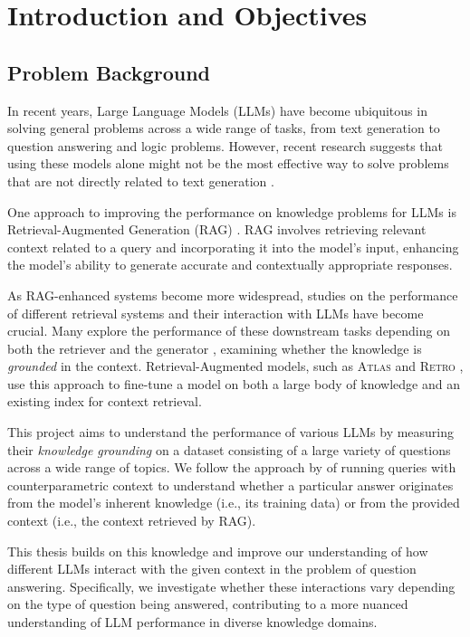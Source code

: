 \section{Introduction and Objectives}

\subsection{Problem Background}

In recent years, Large Language Models (LLMs) have become ubiquitous in solving general problems across a wide range of tasks, from text generation to question answering and logic problems.
However, recent research suggests that using these models alone might not be the most effective way to solve problems that are not directly related to text generation \citep{treeofthoughts}.

One approach to improving the performance on knowledge problems for LLMs is Retrieval-Augmented Generation (RAG) \citep{rag}. RAG involves retrieving relevant context related to a query and incorporating it into the model's input, enhancing the model's ability to generate accurate and contextually appropriate responses.

As RAG-enhanced systems become more widespread, studies on the performance of different retrieval systems and their interaction with LLMs have become crucial.
Many explore the performance of these downstream tasks depending on both the retriever and the generator \citep{can_rag_models_reason,fewshotlearners}, examining whether the knowledge is \textit{grounded} in the context.
Retrieval-Augmented models, such as \textsc{Atlas} \citep{atlas_foundational} and \textsc{Retro} \citep{retro}, use this approach to fine-tune a model on both a large body of knowledge and an existing index for context retrieval.

This project aims to understand the performance of various LLMs by measuring their \textit{knowledge grounding} on a dataset consisting of a large variety of questions across a wide range of topics.
We follow the approach by \citeauthor{factual_recall} of running queries with counterparametric context to understand whether a particular answer originates from the model's inherent knowledge (i.e., its training data) or from the provided context (i.e., the context retrieved by RAG).

This thesis builds on this knowledge and improve our understanding of how different LLMs interact with the given context in the problem of question answering.
Specifically, we investigate whether these interactions vary depending on the type of question being answered, contributing to a more nuanced understanding of LLM performance in diverse knowledge domains.

